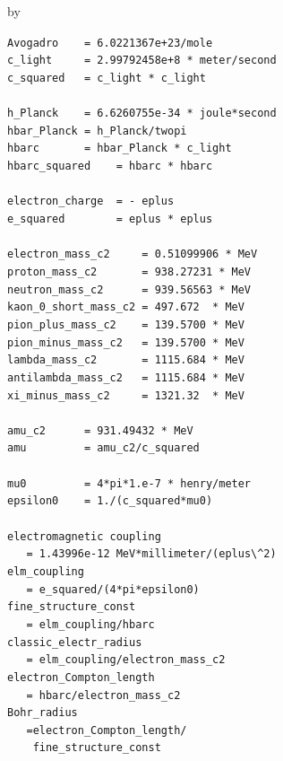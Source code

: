 \documentclass[twoside]{article}
\newcommand{\entrylabel}[1]{\mbox{\textbf{{#1}}}\hfil}%
\newenvironment{entry}
{\begin{list}{}%
    {\renewcommand{\makelabel}{\entrylabel}%
     \setlength{\labelwidth}{90pt}%
     \setlength{\leftmargin}{\labelwidth}
     \advance\leftmargin by \labelsep%
      }%
    }%
  {\end{list}}
\newcommand{\Entrylabel}[1]%
{\raisebox{0pt}[1ex][0pt]{\makebox[\labelwidth][l]%
    {\parbox[t]{\labelwidth}{\hspace{0pt}\textbf{{#1}}}}}}
\newenvironment{Entry}%
{\renewcommand{\entrylabel}{\Entrylabel}\begin{entry}}%
  {\end{entry}}
\begin{document}
\begin{Entry}
  \verb#Avogadro    = 6.0221367e+23/mole# \\
  \verb#c_light     = 2.99792458e+8 * meter/second#\\      
  \verb+c_squared   = c_light * c_light+\\ \\
  \verb+h_Planck    = 6.6260755e-34 * joule*second+\\
  \verb+hbar_Planck = h_Planck/twopi+\\
  \verb+hbarc       = hbar_Planck * c_light+\\
  \verb+hbarc_squared    = hbarc * hbarc+\\ \\
  \verb+electron_charge  = - eplus+ \\            
  \verb+e_squared        = eplus * eplus+\\ \\
  \verb+electron_mass_c2     = 0.51099906 * MeV+\\  
  \verb+proton_mass_c2       = 938.27231 * MeV+\\
  \verb+neutron_mass_c2      = 939.56563 * MeV+\\
  \verb+kaon_0_short_mass_c2 = 497.672  * MeV+\\
  \verb+pion_plus_mass_c2    = 139.5700 * MeV+\\
  \verb+pion_minus_mass_c2   = 139.5700 * MeV+\\
  \verb+lambda_mass_c2       = 1115.684 * MeV+\\
  \verb+antilambda_mass_c2   = 1115.684 * MeV+\\
  \verb+xi_minus_mass_c2     = 1321.32  * MeV+\\ \\
  \verb+amu_c2      = 931.49432 * MeV+ \\
  \verb+amu         = amu_c2/c_squared+ \\ \\
  \verb+mu0         = 4*pi*1.e-7 * henry/meter+ \\
  \verb+epsilon0    = 1./(c_squared*mu0)+ \\ \\
  \verb+electromagnetic coupling+ \\
  \verb+   = 1.43996e-12 MeV*millimeter/(eplus\^2)+ \\
  \verb+elm_coupling+ \\
  \verb+   = e_squared/(4*pi*epsilon0)+ \\
  \verb+fine_structure_const +\\
  \verb+   = elm_coupling/hbarc+ \\
  \verb+classic_electr_radius+ \\
  \verb+   = elm_coupling/electron_mass_c2+ \\
  \verb+electron_Compton_length +\\
  \verb+   = hbarc/electron_mass_c2+ \\
  \verb+Bohr_radius+ \\
  \verb+   =electron_Compton_length/+ \\
  \verb+    fine_structure_const+ \\ 
  

\end{Entry}
\end{document}
